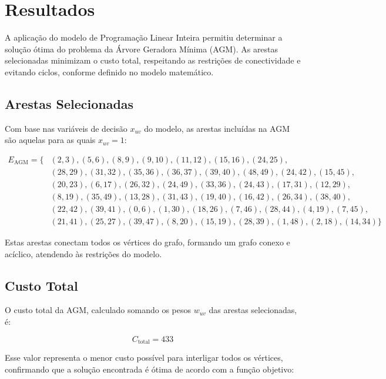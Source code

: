 \section{Resultados}%
\label{sec:resultados}

A aplicação do modelo de Programação Linear Inteira permitiu determinar a solução ótima do problema da Árvore Geradora Mínima (AGM). As arestas selecionadas minimizam o custo total, respeitando as restrições de conectividade e evitando ciclos, conforme definido no modelo matemático.

\subsection{Arestas Selecionadas}%
\label{sec:arestas_selecionadas}

Com base nas variáveis de decisão \(x_{uv}\) do modelo, as arestas incluídas na AGM são aquelas para as quais \(x_{uv} = 1\):

\[
\begin{aligned}
    E_{\text{AGM}} = \{ & (2,3), (5,6), (8,9), (9,10), (11,12), (15,16), (24,25), \\
    & (28,29), (31,32), (35,36), (36,37), (39,40), (48,49), (24,42), (15,45), \\
    & (20,23), (6,17), (26,32), (24,49), (33,36), (24,43), (17,31), (12,29), \\
    & (8,19), (35,49), (13,28), (31,43), (19,40), (16,42), (26,34), (38,40), \\
    & (22,42), (39,41), (0,6), (1,30), (18,26), (7,46), (28,44), (4,19), (7,45), \\
    & (21,41), (25,27), (39,47), (8,20), (15,19), (28,39), (1,48), (2,18), (14,34) \}
\end{aligned}
\]

Estas arestas conectam todos os vértices do grafo, formando um grafo conexo e acíclico, atendendo às restrições do modelo.

\subsection{Custo Total}%
\label{sec:custo_total}

O custo total da AGM, calculado somando os pesos \(w_{uv}\) das arestas selecionadas, é:

\[
    C_{\text{total}} = 433
\]

Esse valor representa o menor custo possível para interligar todos os vértices, confirmando que a solução encontrada é ótima de acordo com a função objetivo:

